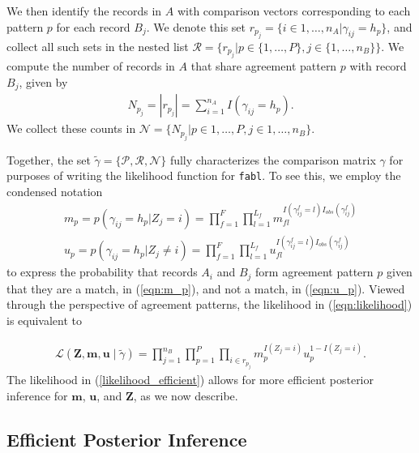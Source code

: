 \documentclass[ba]{imsart}
\begin{document}
We then identify the records in $A$ with comparison vectors corresponding to each pattern $p$ for each record $B_j$. We denote this set $r_{p_j} = \{i \in 1, \dots, n_A | \gamma_{ij} = h_p\}$, and collect all such sets in the nested list $\mathcal{R} = \{r_{p_j} | p \in \{1, \ldots, P\}, j \in \{1, \ldots, n_B\} \}$. We compute the number of records in $A$ that share agreement pattern $p$ with record $B_j$, given by
\begin{align}\label{eqn:N}
N_{p_j} = |r_{p_j}| = \sum_{i=1}^{n_A} I(\gamma_{ij} = h_p).
\end{align}
We collect these counts in $\mathcal{N} = \{N_{p_j} |p \in 1, \ldots, P, j \in 1, \ldots, n_B \}$. 

Together, the set $\tilde{\gamma} = \{\mathcal{P}, \mathcal{R}, \mathcal{N}\}$ fully characterizes the comparison matrix $\gamma$ for purposes of writing the likelihood function for \texttt{fabl}. To see this, we employ the condensed notation
\begin{subequations}
	\begin{align}
		m_p =  p(\gamma_{ij} = h_p|Z_j = i) = \prod_{f=1}^{F}\prod_{l=1}^{L_f} m_{fl}^{I(\gamma_{ij}^f = l)I_{obs}(\gamma_{ij}^f)}\label{eqn:m_p} \\
		u_p =  p(\gamma_{ij} = h_p|Z_j \neq i) = \prod_{f=1}^{F}\prod_{l=1}^{L_f} u_{fl}^{I(\gamma_{ij}^f = l)I_{obs}(\gamma_{ij}^f)}\label{eqn:u_p}
	\end{align}
\end{subequations}
to express the probability that records $A_i$ and $B_j$ form agreement pattern $p$ given that they are a match, in (\ref{eqn:m_p}), and not a match, in (\ref{eqn:u_p}). Viewed through the perspective of agreement patterns, the likelihood in (\ref{eqn:likelihood}) is equivalent to

\begin{align}\label{likelihood_efficient}
	\mathcal{L}(\bm{Z}, \bm{m}, \bm{u} \mid \tilde{\gamma}) = \prod_{j=1}^{n_B}\prod_{p=1}^P \prod_{i \in r_{p_j}} m_p^{I(Z_j = i)}u_p^{1 - I(Z_j = i)}. 
\end{align}
The likelihood in (\ref{likelihood_efficient}) allows for more
efficient posterior inference for $\bm{m}$, $\bm{u}$, and $\bm{Z}$, as we now describe.

\hypertarget{efficient-posterior}{%
	\subsection{Efficient Posterior Inference }\label{efficient-posterior}}
\end{document}
